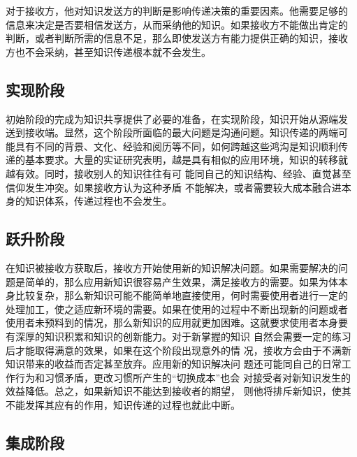 \documentclass[12pt,a4paper]{Ctexart}
\begin{document}
对于接收方，他对知识发送方的判断是影响传递决策的重要因素。他需要足够的
信息来决定是否要相信发送方，从而采纳他的知识。如果接收方不能做出肯定的
判断，或者判断所需的信息不足，那么即使发送方有能力提供正确的知识，接收
方也不会采纳，甚至知识传递根本就不会发生。

\subsection{实现阶段}
初始阶段的完成为知识共享提供了必要的准备，在实现阶段，知识开始从源端发
送到接收端。显然，这个阶段所面临的最大问题是沟通问题。知识传递的两端可
能具有不同的背景、文化、经验和阅历等不同，如何跨越这些鸿沟是知识顺利传
递的基本要求。大量的实证研究表明，越是具有相似的应用环境，知识的转移就
越有效。同时，接收别人的知识往往有可
能同自己的知识结构、经验、直觉甚至信仰发生冲突。如果接收方认为这种矛盾
不能解决，或者需要较大成本融合进本身的知识体系，传递过程也不会发生。


\subsection{跃升阶段}

在知识被接收方获取后，接收方开始使用新的知识解决问题。如果需要解决的问
题是简单的，那么应用新知识很容易产生效果，满足接收方的需要。如果为体本
身比较复杂，那么新知识可能不能简单地直接使用，何时需要使用者进行一定的
处理加工，使之适应新环境的需要。如果在使用的过程中不断出现新的问题或者
使用者未预料到的情况，那么新知识的应用就更加困难。这就要求使用者本身要
有深厚的知识积累和知识的创新能力。对于新掌握的知识
自然会需要一定的练习后才能取得满意的效果，如果在这个阶段出现意外的情
况，接收方会由于不满新知识带来的收益而否定甚至放弃。应用新的知识解决问
题还可能同自己的日常工作行为和习惯矛盾，更改习惯所产生的“切换成本”也会
对接受者对新知识发生的效益降低。总之，如果新知识不能达到接收者的期望，
则他将排斥新知识，使其不能发挥其应有的作用，知识传递的过程也就此中断。

\subsection{集成阶段}
\end{document}
